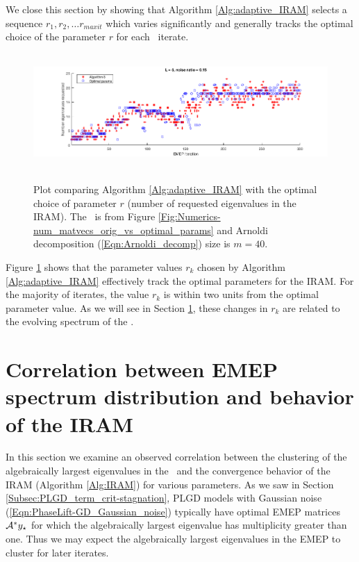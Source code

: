 We close this section by showing that Algorithm \ref{Alg:adaptive_IRAM} selects a sequence $r_1, r_2, \ldots r_{maxit}$ which varies significantly and generally tracks the optimal choice of the parameter $r$ for each \emep \ iterate.

\begin{figure}[H]
\centering
\hbox{\hspace{-1.8cm} \includegraphics[scale=0.6]{Numerics-num_eigs_ada_vs_opt_1} }\vspace{0.6cm}
\vspace{0.2cm}
	\caption{
	Plot comparing Algorithm \ref{Alg:adaptive_IRAM} with the optimal choice of parameter $r$ (number of requested eigenvalues in the IRAM).
	 The \emep \ is from Figure \ref{Fig:Numerics-num_matvecs_orig_vs_optimal_params} and Arnoldi decomposition (\ref{Eqn:Arnoldi_decomp}) size is $m=40$.
	}
\label{Fig:Numerics-num_eigs_ada_vs_opt_one_plot}
\end{figure}

Figure \ref{Fig:Numerics-num_eigs_ada_vs_opt_one_plot} shows that the parameter values $r_k$ chosen by Algorithm \ref{Alg:adaptive_IRAM} effectively track the optimal parameters for the IRAM.  
For the majority of iterates, the value $r_k$ is within two units from the optimal parameter value.
As we will see in Section \ref{Subsec:Numerics-correl_btwn_EMEP_and_IRAM}, these changes in $r_k$ are related to the evolving spectrum of the \emep.




 


\section{Correlation between EMEP spectrum distribution and behavior of the IRAM}
\label{Subsec:Numerics-correl_btwn_EMEP_and_IRAM}



In this section we examine an observed correlation between the clustering of the algebraically largest eigenvalues in the \emep \ and the convergence behavior of the IRAM (Algorithm \ref{Alg:IRAM}) for various parameters.
As we saw in Section \ref{Subsec:PLGD_term_crit-stagnation}, PLGD models with Gaussian noise (\ref{Eqn:PhaseLift-GD_Gaussian_noise}) typically have optimal EMEP matrices ${\mathcal A}^*y_\star$ for which the algebraically largest eigenvalue has multiplicity greater than one.
Thus we may expect the algebraically largest eigenvalues in the EMEP to cluster for later iterates.

